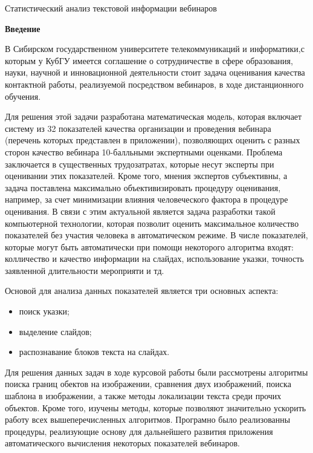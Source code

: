 \documentclass[oneside,final,14pt]{extreport}
\begin{document}
Статистический анализ текстовой информации вебинаров
\newpage
\tableofcontents
\newpage
\begin{center}
\bfseries Введение
\end{center}

	В Сибирском государственном университете телекоммуникаций и информатики,с которым у КубГУ имеется соглашение о сотрудничестве в сфере образования, науки, научной и инновационной деятельности стоит задача оценивания
качества контактной работы, реализуемой посредством вебинаров, в ходе дистанционного обучения. 

Для решения этой задачи разработана математическая модель, которая включает систему из 32 показателей качества организации и проведения вебинара (перечень которых представлен в приложении), позволяющих оценить с разных сторон  качество вебинара 10-балльными экспертными оценками. Проблема заключается в существенных трудозатратах, которые несут эксперты при оценивании этих показателей. Кроме того, мнения экспертов субъективны, а задача поставлена максимально объективизировать процедуру оценивания, например, за счет минимизации влияния человеческого фактора в процедуре оценивания. В связи с этим актуальной является  задача разработки такой компьютерной технологии, которая позволит оценить максимальное количество показателей без участия человека в автоматическом режиме. В числе показателей, которые могут быть автоматически при помощи некоторого алгоритма входят: колличество и качество информации на слайдах, использование указки, точность заявленной длительности мероприяти и тд.

Основой для анализа данных показателей является три основных аспекта:
\begin{itemize}
\item поиск указки;
\item выделение слайдов;
\item распознавание блоков текста на слайдах.
\end{itemize} 
Для решения данных задач в ходе курсовой работы были рассмотрены алгоритмы поиска границ обектов на изображении, сравнения двух изображений, поиска шаблона в изображении, а также методы локализации текста среди прочих объектов. Кроме того, изучены методы, которые позволяют значительно ускорить работу всех вышеперечисленных алгоритмов. Програмно было реализованны процедуры, реализующие основу для дальнейшего развития приложения автоматического вычисления некоторых показателей вебинаров. 
\end{document}
